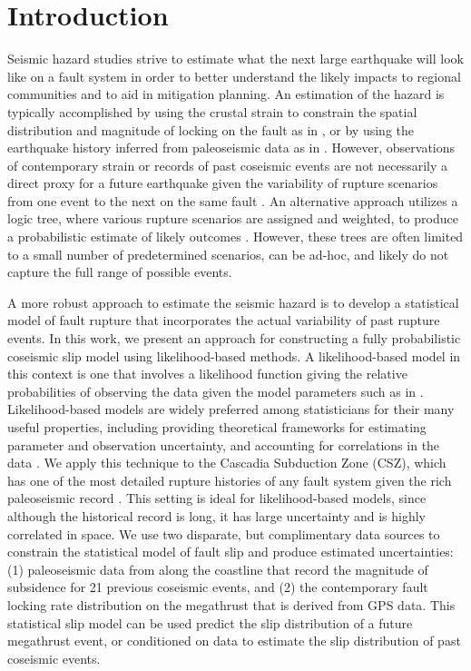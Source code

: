 {\section{Introduction}
\label{intro}
Seismic hazard studies strive to estimate what the next large earthquake will look like on a fault system in order to better understand the likely impacts to regional communities and to aid in mitigation planning.  An estimation of the hazard is typically accomplished by using the crustal strain to constrain the spatial distribution and magnitude of locking on the fault as in \citet{mccaffrey2013}, or by using the earthquake history inferred from paleoseismic data as in \citet{wang2013}.  However, observations of contemporary strain or records of past coseismic events are not necessarily a direct proxy for a future earthquake given the variability of rupture scenarios from one event to the next on the same fault \citet{stein2012}.  An alternative approach utilizes a logic tree, where various rupture scenarios are assigned and weighted, to produce a probabilistic estimate of likely outcomes \citep{witter2013}.  However, these trees are often limited to a small number of predetermined scenarios, can be ad-hoc, and likely do not capture the full range of possible events.

A more robust approach to estimate the seismic hazard is to develop a statistical model of fault rupture that incorporates the actual variability of past rupture events.  In this work, we present an approach for constructing a fully probabilistic coseismic slip model using likelihood-based methods.  A likelihood-based model in this context is one that involves a likelihood function giving the relative probabilities of observing the data given the model parameters such as in \citep{minson2013, duputel2015}.  Likelihood-based models are widely preferred among statisticians for their many useful properties, including providing theoretical frameworks for estimating parameter and observation uncertainty, and accounting for correlations in the data \citep[Ch. 6-10]{CasellaBerger}.  We apply this technique to the Cascadia Subduction Zone (CSZ), which has one of the most detailed rupture histories of any fault system given the rich paleoseismic record \citep{leonard2010}.  This setting is ideal for likelihood-based models, since although the historical record is long, it has large uncertainty and is highly correlated in space.  We use two disparate, but complimentary data sources to constrain the statistical model of fault slip and produce estimated uncertainties: (1) paleoseismic data from along the coastline that record the magnitude of subsidence for 21 previous coseismic events, and (2) the contemporary fault locking rate distribution on the megathrust that is derived from GPS data.  This statistical slip model can be used predict the slip distribution of a future megathrust event, or conditioned on data to estimate the slip distribution of past coseismic events. 

}

